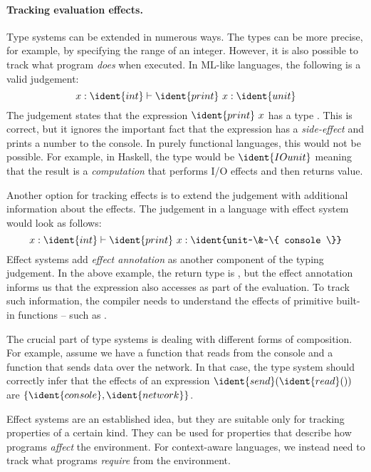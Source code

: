 \paragraph{Tracking evaluation effects.}
Type systems can be extended in numerous ways. The types can be more precise, for example, by specifying
the range of an integer. However, it is also possible to track what program \emph{does} when executed.
In ML-like languages, the following is a valid judgement:
%
\begin{equation*}
x\-:\-\ident{int} \vdash \ident{print}~x : \ident{unit}
\end{equation*}
%
The judgement states that the expression $\ident{print}~x$ has a type . This is correct, 
but it ignores the important fact that the expression has a \emph{side-effect} and prints a number
to the console. In purely functional languages, this would not be possible. For example, in Haskell,
the type would be $\ident{IO unit}$ meaning that the result is a \emph{computation} that performs I/O
effects and then returns  value. 

Another option for tracking effects is to extend the judgement with additional information 
about the effects. The judgement in a language with effect system would look as follows:
%
\begin{equation*}
x\-:\-\ident{int} \vdash \ident{print}~x : \ident{unit~\&~\{ console \}}
\end{equation*}
%
Effect systems add \emph{effect annotation} as another component of the typing judgement. In the above
example, the return type is , but the effect annotation informs us that the expression
also accesses  as part of the evaluation. To track such information, the compiler needs
to understand the effects of primitive built-in functions -- such as .

The crucial part of type systems is dealing with different forms of composition. For example, assume
we have a function  that reads from the console and a function  that sends
data over the network. In that case, the type system should correctly infer that the effects of an 
expression $\ident{send}(\ident{read}())$ are $\{ \ident{console}, \ident{network} \}$.

Effect systems are an established idea, but they are suitable only for tracking properties of a
certain kind. They can be used for properties that describe how programs \emph{affect} the environment.
For context-aware languages, we instead need to track what programs \emph{require} from the environment.

